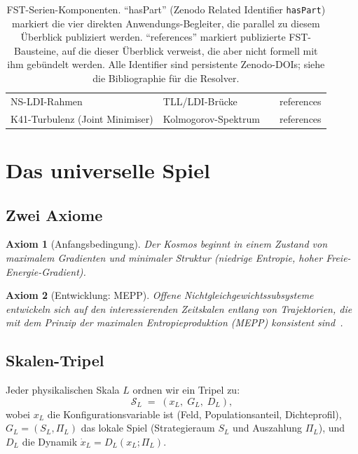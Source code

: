 \documentclass[11pt,a4paper]{article}
\newtheorem{axiom}{Axiom}
\theoremstyle{remark}
\begin{document}
\begin{table}[h]
\begin{tabular}{lllc}
NS-LDI-Rahmen                   & TLL/LDI-Brücke          & \cite{GeigerNSLDI-2026}      & references \\
K41-Turbulenz (Joint Minimiser) & Kolmogorov-Spektrum     & \cite{GeigerK41-2026}        & references \\
\bottomrule
\end{tabular}
\caption{FST-Serien-Komponenten. ``hasPart'' (Zenodo Related Identifier
\texttt{hasPart}) markiert die vier direkten Anwendungs-Begleiter, die
parallel zu diesem Überblick publiziert werden. ``references'' markiert
publizierte FST-Bausteine, auf die dieser Überblick verweist, die aber
nicht formell mit ihm gebündelt werden. Alle Identifier sind persistente
Zenodo-DOIs; siehe die Bibliographie für die Resolver.}
\label{tab:series-components}
\end{table}

\section{Das universelle Spiel}
\label{sec:universal-game}

\subsection{Zwei Axiome}

\begin{axiom}[Anfangsbedingung]
Der Kosmos beginnt in einem Zustand von maximalem Gradienten und minimaler Struktur (niedrige Entropie, hoher Freie-Energie-Gradient).
\end{axiom}

\begin{axiom}[Entwicklung: MEPP]
Offene Nichtgleichgewichtssubsysteme entwickeln sich auf den interessierenden Zeitskalen entlang von Trajektorien, die mit dem Prinzip der maximalen Entropieproduktion (MEPP) konsistent sind~\cite{MartyushevSeleznev2006}.
\end{axiom}

\subsection{Skalen-Tripel}

Jeder physikalischen Skala $L$ ordnen wir ein Tripel zu:
\[
\mathcal{S}_L \;=\; (x_L,\; G_L,\; D_L),
\]
wobei $x_L$ die Konfigurationsvariable ist (Feld, Populationsanteil, Dichteprofil), $G_L = (S_L, \Pi_L)$ das lokale Spiel (Strategieraum $S_L$ und Auszahlung $\Pi_L$), und $D_L$ die Dynamik $\dot{x}_L = D_L(x_L; \Pi_L)$.
\end{document}
